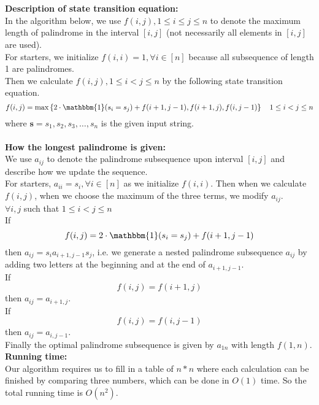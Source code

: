 \documentclass[12pt,letterpaper]{article}
\begin{document}
\newpage
\section{}
\textbf{Description of state transition equation:}\\
In the algorithm below, we use $f(i,j),1\leq i\leq j\leq n$ to denote the maximum length of palindrome in the interval $[i,j]$
(not necessarily all elements in $[i,j]$ are used).\\
\newline
For starters,
we initialize $f(i,i)=1,\forall i\in[n]$ 
because all subsequence of length 1 are palindromes.\\
Then we calculate $f(i,j),1\leq i<j\leq n$ by the following state transition equation.
$$f(i,j)=\max\left\{2\cdot\mathbbm{1}(s_i=s_j)+f(i+1,j-1),f(i+1,j),f(i,j-1)\right\} \quad 1\leq i<j\leq n$$
where $\boldsymbol{s}=s_1,s_2,s_3,\dots,s_n$ is the given input string.
\\\\
\textbf{How the longest palindrome is given:}\\
We use $a_{ij}$ to denote the palindrome subsequence upon interval $[i,j]$
and describe how we update the sequence.\\
For starters, $a_{ii}=s_i,\forall i\in[n]$ as we initialize $f(i,i)$.
Then when we calculate $f(i,j)$, 
when we choose the maximum of the three terms, 
we modify $a_{ij}$.\\
$\forall i,j$ such that $1\leq i<j\leq n$\\
If $$f(i,j)=2\cdot\mathbbm{1}(s_i=s_j)+f(i+1,j-1)$$
then $a_{ij}=s_ia_{i+1,j-1}s_j$,
i.e. we generate a nested palindrome subsequence $a_{ij}$
by adding two letters at the beginning and at the end of $a_{i+1,j-1}$.\\
If $$f(i,j)=f(i+1,j)$$
then $a_{ij}=a_{i+1,j}.$\\
If $$f(i,j)=f(i,j-1)$$
then $a_{ij}=a_{i,j-1}.$\\
Finally the optimal palindrome subsequence is given by $a_{1n}$ with length $f(1,n)$.\\
\textbf{Running time:}\\
Our algorithm requires us to fill in a table of $n*n$ where each calculation can be finished 
by comparing three numbers, 
which can be done in $O(1)$ time.
So the total running time is $O(n^2)$.
\end{document}
